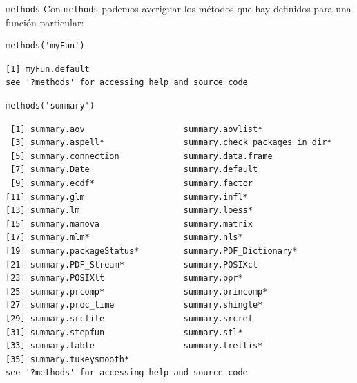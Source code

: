 \documentclass[xcolor={usenames,svgnames,dvipsnames}]{beamer}
\begin{document}
\begin{frame}[fragile,label={sec:org14cf2f7}]{\texttt{methods}}
 Con \texttt{methods} podemos averiguar los métodos que hay definidos para una función particular:
\lstset{language=r,label= ,caption= ,captionpos=b,numbers=none}
\begin{lstlisting}
methods('myFun')
\end{lstlisting}

\begin{verbatim}
[1] myFun.default
see '?methods' for accessing help and source code
\end{verbatim}

\lstset{language=r,label= ,caption= ,captionpos=b,numbers=none}
\begin{lstlisting}
methods('summary')
\end{lstlisting}

\begin{verbatim}
 [1] summary.aov                    summary.aovlist*              
 [3] summary.aspell*                summary.check_packages_in_dir*
 [5] summary.connection             summary.data.frame            
 [7] summary.Date                   summary.default               
 [9] summary.ecdf*                  summary.factor                
[11] summary.glm                    summary.infl*                 
[13] summary.lm                     summary.loess*                
[15] summary.manova                 summary.matrix                
[17] summary.mlm*                   summary.nls*                  
[19] summary.packageStatus*         summary.PDF_Dictionary*       
[21] summary.PDF_Stream*            summary.POSIXct               
[23] summary.POSIXlt                summary.ppr*                  
[25] summary.prcomp*                summary.princomp*             
[27] summary.proc_time              summary.shingle*              
[29] summary.srcfile                summary.srcref                
[31] summary.stepfun                summary.stl*                  
[33] summary.table                  summary.trellis*              
[35] summary.tukeysmooth*          
see '?methods' for accessing help and source code
\end{verbatim}
\end{frame}
\end{document}
